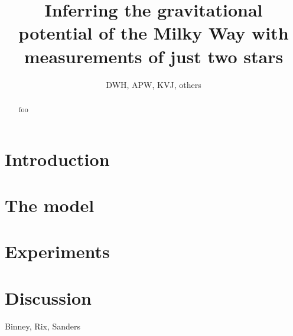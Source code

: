 \documentclass[letterpaper,12pt,preprint]{aastex}
\begin{document}
\title{Inferring the gravitational potential of the Milky Way with measurements of just two stars}
\author{DWH, APW, KVJ, others}

\begin{abstract}
foo
\end{abstract}


\section{Introduction}

\section{The model}

\section{Experiments}

\section{Discussion}

\acknowledgements
Binney, Rix, Sanders
\end{document}
